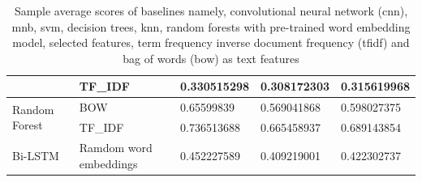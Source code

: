 \begin{table}[h!]
{\begin{tabular}{@{}lllll@{}}
\multicolumn{1}{|l|}{} &
  \multicolumn{1}{l|}{TF\_IDF} &
  \multicolumn{1}{l|}{0.330515298} &
  \multicolumn{1}{l|}{0.308172303} &
  \multicolumn{1}{l|}{0.315619968} \\ \midrule
\multicolumn{1}{|l|}{\multirow{2}{*}{Random Forest}} &
  \multicolumn{1}{l|}{BOW} &
  \multicolumn{1}{l|}{0.65599839} &
  \multicolumn{1}{l|}{0.569041868} &
  \multicolumn{1}{l|}{0.598027375} \\ \cmidrule(l){2-5} 
\multicolumn{1}{|l|}{} &
  \multicolumn{1}{l|}{TF\_IDF} &
  \multicolumn{1}{l|}{0.736513688} &
  \multicolumn{1}{l|}{0.665458937} &
  \multicolumn{1}{l|}{0.689143854} \\ \midrule
\multicolumn{1}{|l|}{Bi-LSTM} &
  \multicolumn{1}{l|}{Ramdom word embeddings} &
  \multicolumn{1}{l|}{0.452227589} &
  \multicolumn{1}{l|}{0.409219001} &
  \multicolumn{1}{l|}{0.422302737} \\ \bottomrule
\end{tabular}%
}

\caption{Sample average scores of baselines namely, convolutional neural network (\acrshort{cnn}), \acrfull{mnb}, \acrfull{svm}, decision trees, \acrfull{knn}, random forests with pre-trained word embedding model, selected features, term frequency inverse document frequency (\acrshort{tfidf}) and bag of words (\acrshort{bow}) as text features}
\label{tab:Sample average scores baselines}
\end{table}

